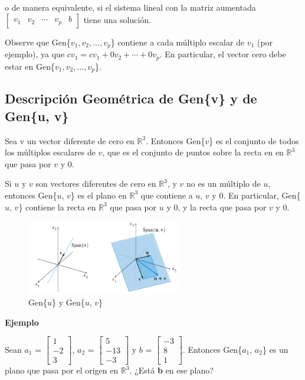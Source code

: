 \documentclass{article}
\begin{document}
o de manera equivalente, si el sistema lineal con la matriz aumentada $\begin{bmatrix} v_1 & v_2 & \dotsb & v_p & b \end{bmatrix}$ tiene una solución.

Observe que Gen\{$v_1,v_2,\dots, v_p$\} contiene a cada múltiplo escalar de $v_1$ (por ejemplo), ya que $cv_1 = cv_1 + 0v_2 + \dotsb + 0v_p$. En particular, el vector cero debe estar en Gen\{$v_1,v_2,\dots, v_p$\}.

\subsection*{Descripción Geométrica de Gen\{v\} y de Gen\{u, v\}}

Sea v un vector diferente de cero en $\mathbb{R}^3$. Entonces Gen\{\textbf{$v$}\} es el conjunto de todos los múltiplos escalares de \textbf{$v$}, que es el conjunto de puntos sobre la recta en en $\mathbb{R}^3$ que pasa por \textbf{$v$} y 0. 

Si \textbf{$u$} y \textbf{$v$} son vectores diferentes de cero en $\mathbb{R}^3$, y \textbf{$v$} no es un múltiplo de \textbf{$u$}, entonces Gen\{\textbf{$u$}, \textbf{$v$}\} es el plano en $\mathbb{R}^3$ que contiene a \textbf{$u$}, \textbf{$v$} y 0. En particular, Gen\{\textbf{$u$}, \textbf{$v$}\} contiene la recta en $\mathbb{R}^3$ que pasa por \textbf{$u$} y 0, y la recta que pasa por \textbf{$v$} y 0.

\begin{figure}[ht]
    \centerline{\includegraphics[width=0.6\textwidth]{image11.png}}
    \caption{Gen\{\textbf{$u$}\} y Gen\{\textbf{$u$}, \textbf{$v$}\}}
    \label{}
\end{figure}

\begin{large}
    \textbf{Ejemplo}
\end{large}

Sean \textbf{$a_1$} = $\begin{bmatrix} 1\\-2\\3 \end{bmatrix}$, \textbf{$a_2$} = $\begin{bmatrix} 5\\-13\\-3 \end{bmatrix}$ y \textbf{$b$} = $\begin{bmatrix} -3\\8\\1 \end{bmatrix}$. Entonces  Gen\{\textbf{$a_1$}, \textbf{$a_2$}\} es un plano que pasa por el origen en $\mathbb{R}^3$. ¿Está \textbf{b} en ese plano?
\end{document}
